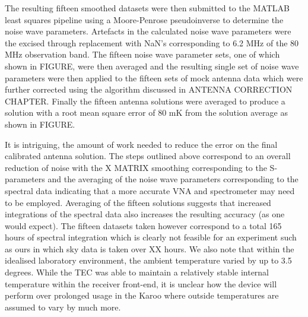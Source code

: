 The resulting fifteen smoothed datasets were then submitted to the MATLAB least squares pipeline using a Moore-Penrose pseudoinverse to determine the noise wave parameters. Artefacts in the calculated noise wave parameters were the excised through replacement with NaN’s corresponding to 6.2 MHz of the 80 MHz observation band. The fifteen noise wave parameter sets, one of which shown in FIGURE, were then averaged and the resulting single set of noise wave parameters were then applied to the fifteen sets of mock antenna data which were further corrected using the algorithm discussed in ANTENNA CORRECTION CHAPTER. Finally the fifteen antenna solutions were averaged to produce a solution with a root mean square error of 80 mK from the solution average as shown in FIGURE.

It is intriguing, the amount of work needed to reduce the error on the final calibrated antenna solution. The steps outlined above correspond to an overall reduction of noise with the X MATRIX smoothing corresponding to the S-parameters and the averaging of the noise wave parameters corresponding to the spectral data indicating that a more accurate VNA and spectrometer may need to be employed. Averaging of the fifteen solutions suggests that increased integrations of the spectral data also increases the resulting accuracy (as one would expect). The fifteen datasets taken however correspond to a total 165 hours of spectral integration which is clearly not feasible for an experiment such as ours in which sky data is taken over XX hours. We also note that within the idealised laboratory environment, the ambient temperature varied by up to 3.5 degrees. While the TEC was able to maintain a relatively stable internal temperature within the receiver front-end, it is unclear how the device will perform over prolonged usage in the Karoo where outside temperatures are assumed to vary by much more. 

